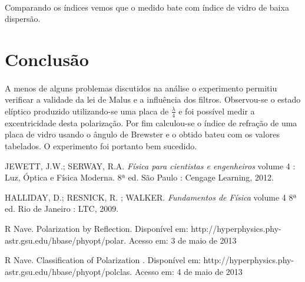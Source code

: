 \documentclass[a4paper,11pt]{article}
\begin{document}
\paragraph{}Comparando os índices vemos que o medido bate com índice de vidro de baixa dispersão.
\section{Conclusão}
\paragraph{}  A menos de alguns problemas discutidos na análise o experimento permitiu verificar a validade da lei de Malus e a influência dos filtros. Observou-se o estado elíptico produzido utilizando-se uma placa de $\frac{\lambda}{4}$  e foi possível medir a excentricidade desta polarização. Por fim calculou-se o índice de refração de uma placa de vidro usando o ângulo de Brewster e o obtido bateu com os valores tabelados. O experimento foi portanto bem sucedido.



\begin{thebibliography}{9}    
  		JEWETT, J.W.; SERWAY, R.A.
  		\emph{Física para cientistas e engenheiros} volume 4 : Luz, Óptica e Física Moderna.
 		 8ª ed.
 		 São Paulo : Cengage Learning, 2012.
 		 
  		HALLIDAY, D.; RESNICK, R. ; WALKER.
  		\emph{Fundamentos de Física} volume 4
 		 8ª ed.
 		 Rio de Janeiro : LTC, 2009.
 		 
 			R Nave. Polarization by Reflection. Disponível em: http://hyperphysics.phy-astr.gsu.edu/hbase/phyopt/polar. Acesso em: 3 de maio de 2013
 			 	
 			R Nave. Classification of Polarization . Disponível em: http://hyperphysics.phy-astr.gsu.edu/hbase/phyopt/polclas. Acesso em: 4 de maio de 2013


\end{thebibliography}
\end{document}
